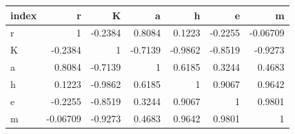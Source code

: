 \begin{tabular}{lrrrrrr}
\toprule
index & r & K & a & h & e & m \\
\midrule
r & 1 & -0.2384 & 0.8084 & 0.1223 & -0.2255 & -0.06709 \\
K & -0.2384 & 1 & -0.7139 & -0.9862 & -0.8519 & -0.9273 \\
a & 0.8084 & -0.7139 & 1 & 0.6185 & 0.3244 & 0.4683 \\
h & 0.1223 & -0.9862 & 0.6185 & 1 & 0.9067 & 0.9642 \\
e & -0.2255 & -0.8519 & 0.3244 & 0.9067 & 1 & 0.9801 \\
m & -0.06709 & -0.9273 & 0.4683 & 0.9642 & 0.9801 & 1 \\
\bottomrule
\end{tabular}
